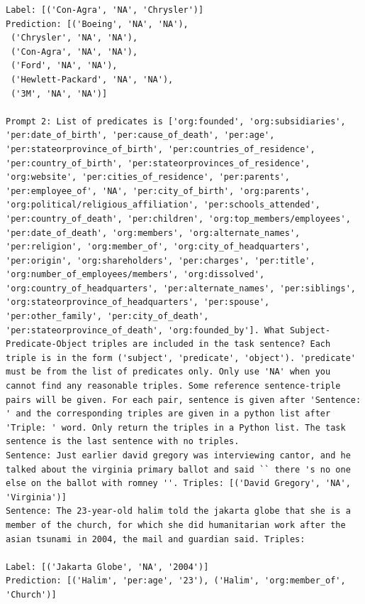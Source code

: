 \documentclass{article}
\begin{document}
\begin{lstlisting}
Label: [('Con-Agra', 'NA', 'Chrysler')]
Prediction: [('Boeing', 'NA', 'NA'),
 ('Chrysler', 'NA', 'NA'),
 ('Con-Agra', 'NA', 'NA'),
 ('Ford', 'NA', 'NA'),
 ('Hewlett-Packard', 'NA', 'NA'),
 ('3M', 'NA', 'NA')]

Prompt 2: List of predicates is ['org:founded', 'org:subsidiaries', 'per:date_of_birth', 'per:cause_of_death', 'per:age', 'per:stateorprovince_of_birth', 'per:countries_of_residence', 'per:country_of_birth', 'per:stateorprovinces_of_residence', 'org:website', 'per:cities_of_residence', 'per:parents', 'per:employee_of', 'NA', 'per:city_of_birth', 'org:parents', 'org:political/religious_affiliation', 'per:schools_attended', 'per:country_of_death', 'per:children', 'org:top_members/employees', 'per:date_of_death', 'org:members', 'org:alternate_names', 'per:religion', 'org:member_of', 'org:city_of_headquarters', 'per:origin', 'org:shareholders', 'per:charges', 'per:title', 'org:number_of_employees/members', 'org:dissolved', 'org:country_of_headquarters', 'per:alternate_names', 'per:siblings', 'org:stateorprovince_of_headquarters', 'per:spouse', 'per:other_family', 'per:city_of_death', 'per:stateorprovince_of_death', 'org:founded_by']. What Subject-Predicate-Object triples are included in the task sentence? Each triple is in the form ('subject', 'predicate', 'object'). 'predicate' must be from the list of predicates only. Only use 'NA' when you cannot find any reasonable triples. Some reference sentence-triple pairs will be given. For each pair, sentence is given after 'Sentence: ' and the corresponding triples are given in a python list after 'Triple: ' word. Only return the triples in a Python list. The task sentence is the last sentence with no triples.
Sentence: Just earlier david gregory was interviewing cantor, and he talked about the virginia primary ballot and said `` there 's no one else on the ballot with romney ''. Triples: [('David Gregory', 'NA', 'Virginia')]
Sentence: The 23-year-old halim told the jakarta globe that she is a member of the church, for which she did humanitarian work after the asian tsunami in 2004, the mail and guardian said. Triples:

Label: [('Jakarta Globe', 'NA', '2004')]
Prediction: [('Halim', 'per:age', '23'), ('Halim', 'org:member_of', 'Church')]


\end{lstlisting}
\end{document}
